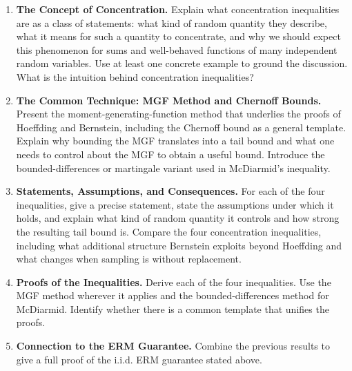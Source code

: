 \documentclass[11pt]{article}
\begin{document}
\begin{enumerate}

\item \textbf{The Concept of Concentration.}
Explain what concentration inequalities are as a class of statements: what kind of random quantity they describe, what it means for such a quantity to concentrate, and why we should expect this phenomenon for sums and well-behaved functions of many independent random variables. Use at least one concrete example to ground the discussion. What is the intuition behind concentration inequalities?

\item \textbf{The Common Technique: MGF Method and Chernoff Bounds.}
Present the moment-generating-function method that underlies the proofs of Hoeffding and Bernstein, including the Chernoff bound as a general template. Explain why bounding the MGF translates into a tail bound and what one needs to control about the MGF to obtain a useful bound. Introduce the bounded-differences or martingale variant used in McDiarmid's inequality.

\item \textbf{Statements, Assumptions, and Consequences.}
For each of the four inequalities, give a precise statement, state the assumptions under which it holds, and explain what kind of random quantity it controls and how strong the resulting tail bound is. Compare the four concentration inequalities, including what additional structure Bernstein exploits beyond Hoeffding and what changes when sampling is without replacement.

\item \textbf{Proofs of the Inequalities.}
Derive each of the four inequalities. Use the MGF method wherever it applies and the bounded-differences method for McDiarmid. Identify whether there is a common template that unifies the proofs.

\item \textbf{Connection to the ERM Guarantee.}
Combine the previous results to give a full proof of the i.i.d. ERM guarantee stated above.

\end{enumerate}
\end{document}

